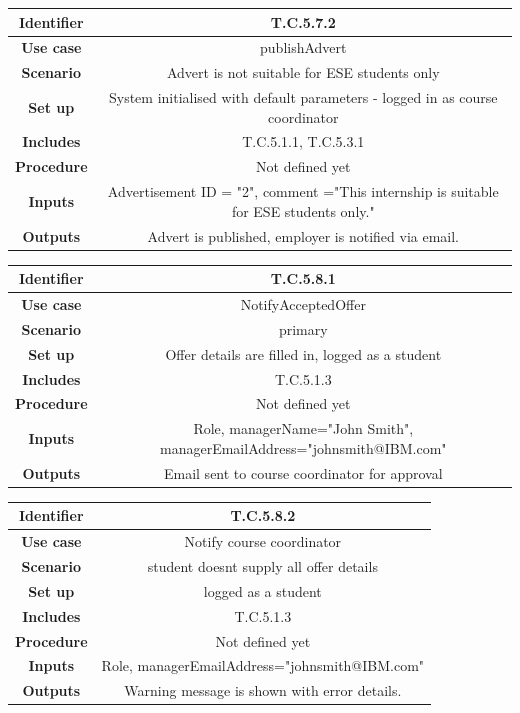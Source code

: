 \documentclass{l3deliverable}
\begin{document}
\begin{tabular}{|c|c|}
\hline \textbf{Identifier} & T.C.5.7.2\\
\hline \textbf{Use case} & publishAdvert\\
\hline \textbf{Scenario} & Advert is not suitable for ESE students only\\
\hline \textbf{Set up} & System initialised with default parameters - logged in as course coordinator\\
\hline \textbf{Includes} & T.C.5.1.1, T.C.5.3.1\\
\hline \textbf{Procedure} & Not defined yet\\
\hline \textbf{Inputs} & Advertisement ID = "2", comment ="This internship is suitable for ESE students only."\\
\hline \textbf{Outputs} & Advert is published, employer is notified via email.\\
\hline
\end{tabular}

\begin{tabular}{|c|c|}
\hline \textbf{Identifier} & T.C.5.8.1\\
\hline \textbf{Use case} & NotifyAcceptedOffer\\
\hline \textbf{Scenario} & primary\\
\hline \textbf{Set up} & Offer details are filled in, logged as a student\\
\hline \textbf{Includes} & T.C.5.1.3\\
\hline \textbf{Procedure} & Not defined yet\\
\hline \textbf{Inputs} & Role, managerName="John Smith", managerEmailAddress="johnsmith@IBM.com"\\
\hline \textbf{Outputs} & Email sent to course coordinator for approval\\
\hline
\end{tabular}

\begin{tabular}{|c|c|}
\hline \textbf{Identifier} & T.C.5.8.2\\
\hline \textbf{Use case} & Notify course coordinator\\
\hline \textbf{Scenario} & student doesnt supply all offer details\\
\hline \textbf{Set up} & logged as a student\\
\hline \textbf{Includes} & T.C.5.1.3\\
\hline \textbf{Procedure} & Not defined yet\\
\hline \textbf{Inputs} & Role, managerEmailAddress="johnsmith@IBM.com"\\
\hline \textbf{Outputs} & Warning message is shown with error details.\\
\hline
\end{tabular}
\end{document}
